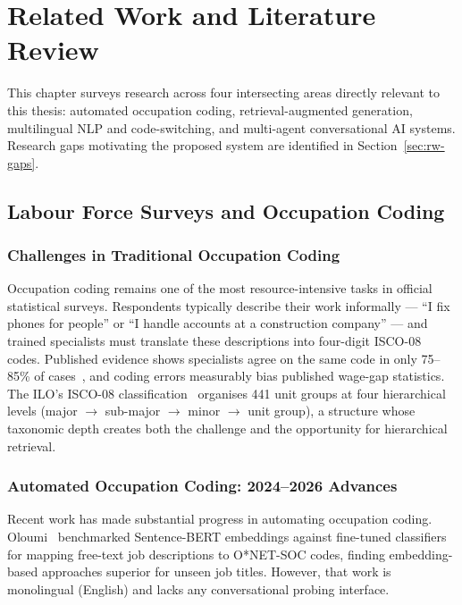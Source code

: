 \chapter{Related Work and Literature Review}
\label{chap:relatedwork}

This chapter surveys research across four intersecting areas directly relevant
to this thesis: automated occupation coding, retrieval-augmented generation,
multilingual NLP and code-switching, and multi-agent conversational AI systems.
Research gaps motivating the proposed system are identified in
Section~\ref{sec:rw-gaps}.

\section{Labour Force Surveys and Occupation Coding}
\label{sec:rw-lfs}

\subsection{Challenges in Traditional Occupation Coding}

Occupation coding remains one of the most resource-intensive tasks in official
statistical surveys.
Respondents typically describe their work informally --- ``I fix phones for
people'' or ``I handle accounts at a construction company'' --- and trained
specialists must translate these descriptions into four-digit ISCO-08 codes.
Published evidence shows specialists agree on the same code in only 75--85\%
of cases~\cite{iea2024occupationcoding}, and coding errors measurably bias
published wage-gap statistics.
The ILO's ISCO-08 classification~\cite{ilo2012isco_v1,ilo2012isco_v2} organises
441 unit groups at four hierarchical levels (major $\to$ sub-major $\to$ minor
$\to$ unit group), a structure whose taxonomic depth creates both the challenge
and the opportunity for hierarchical retrieval.

\subsection{Automated Occupation Coding: 2024--2026 Advances}

Recent work has made substantial progress in automating occupation coding.
Oloumi~\cite{oloumi2026onet} benchmarked Sentence-BERT embeddings against
fine-tuned classifiers for mapping free-text job descriptions to O*NET-SOC
codes, finding embedding-based approaches superior for unseen job titles.
However, that work is monolingual (English) and lacks any conversational
probing interface.

